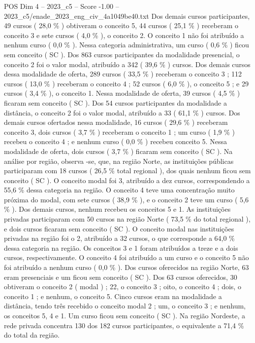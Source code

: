 \begin{textsample}{POS Dim 4 – 2023\_c5 – Score -1.00 – 2023\_c5/enade\_2023\_eng\_civ\_4a1049be40.txt}
Dos demais cursos participantes, 49 cursos ( 28,0 \% ) obtiveram o conceito 5, 44 cursos ( 25,1 \% ) receberam o conceito 3 e sete cursos ( 4,0 \% ), o conceito 2.
O conceito 1 não foi atribuído a nenhum curso ( 0,0 \% ).
Nessa categoria administrativa, um curso ( 0,6 \% ) ficou sem conceito ( SC ).
Dos 863 cursos participantes da modalidade presencial, o conceito 2 foi o valor modal, atribuído a 342 ( 39,6 \% ) cursos.
Dos demais cursos dessa modalidade de oferta, 289 cursos ( 33,5 \% ) receberam o conceito 3 ; 112 cursos ( 13,0 \% ) receberam o conceito 4 ; 52 cursos ( 6,0 \% ), o conceito 5 ; e 29 cursos ( 3,4 \% ), o conceito 1.
Nessa modalidade de oferta, 39 cursos ( 4,5 \% ) ficaram sem conceito ( SC ).
Dos 54 cursos participantes da modalidade a distância, o conceito 2 foi o valor modal, atribuído a 33 ( 61,1 \% ) cursos.
Dos demais cursos ofertados nessa modalidade, 16 cursos ( 29,6 \% ) receberam conceito 3, dois cursos ( 3,7 \% ) receberam o conceito 1 ; um curso ( 1,9 \% ) recebeu o conceito 4 ; e nenhum curso ( 0,0 \% ) recebeu conceito 5.
Nessa modalidade de oferta, dois cursos ( 3,7 \% ) ficaram sem conceito ( SC ).
Na análise por região, observa -se, que, na região Norte, as instituições públicas participaram com 18 cursos ( 26,5 \% total regional ), dos quais nenhum ficou sem conceito ( SC ).
O conceito modal foi 3, atribuído a dez cursos, correspondendo a 55,6 \% dessa categoria na região.
O conceito 4 teve uma concentração muito próxima do modal, com sete cursos ( 38,9 \% ), e o conceito 2 teve um curso ( 5,6 \% ).
Dos demais cursos, nenhum recebeu os conceitos 5 e 1.
As instituições privadas participaram com 50 cursos na região Norte ( 73,5 \% do total regional ), e dois cursos ficaram sem conceito ( SC ).
O conceito modal nas instituições privadas na região foi o 2, atribuído a 32 cursos, o que corresponde a 64,0 \% dessa categoria na região.
Os conceitos 3 e 1 foram atribuídos a treze e a dois cursos, respectivamente.
O conceito 4 foi atribuído a um curso e o conceito 5 não foi atribuído a nenhum curso ( 0,0 \% ).
Dos cursos oferecidos na região Norte, 63 eram presenciais e um ficou sem conceito ( SC ).
Dos 63 cursos oferecidos, 30 obtiveram o conceito 2 ( modal ) ; 22, o conceito 3 ; oito, o conceito 4 ; dois, o conceito 1 ; e nenhum, o conceito 5.
Cinco cursos eram na modalidade a distância, tendo três recebido o conceito modal 2 ; um, o conceito 3 ; e nenhum, os conceitos 5, 4 e 1.
Um curso ficou sem conceito ( SC ).
Na região Nordeste, a rede privada concentra 130 dos 182 cursos participantes, o equivalente a 71,4 \% do total da região.

\end{textsample}

